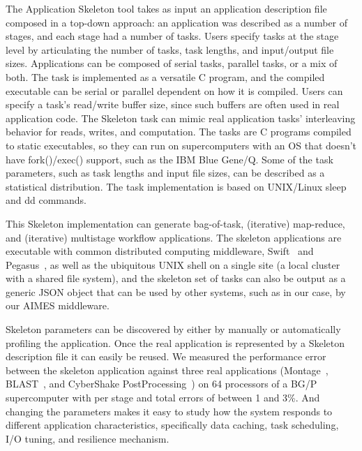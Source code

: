 \documentclass[preprint,12pt]{elsarticle}
\begin{document}
The Application Skeleton tool takes as input an application description file composed in a top-down approach: an application was described
as a number of stages, and each stage had a number of tasks. Users specify tasks at the stage level by articulating
the number of tasks, task lengths, and input/output file sizes. Applications can be composed of serial tasks, parallel tasks, or a mix of both. The task is implemented as a versatile C program, and the compiled executable can be serial or parallel dependent on how it is compiled. 
Users can specify a task's read/write buffer size, since such buffers are often used in real application code. 
The Skeleton task can mimic real application tasks' interleaving behavior for reads, writes, and computation. 
The tasks are C programs compiled to static executables, so they can run on supercomputers with an OS that doesn't have fork()/exec() support, such as the IBM Blue Gene/Q. 
Some of the task parameters, such as task lengths and input file sizes, can be
described as a statistical distribution.
The task implementation is based on UNIX/Linux sleep and dd commands. 

This Skeleton implementation can generate bag-of-task, (iterative) map-reduce, and (iterative) multistage workflow applications. 
The skeleton applications are executable with common
distributed computing middleware, Swift~\cite{SWIFT2007, swift-ieee09, Swift_2011} and Pegasus~\cite{pegasus, pegasus-04}, as well as the ubiquitous UNIX shell on a single 
site (a local cluster with a shared file system), and the skeleton set of tasks can also be output as a generic JSON object that can be used by other systems, such as in our case, by our AIMES middleware.

Skeleton parameters can be discovered by either by manually or automatically profiling the application.
Once the real application is represented by a Skeleton description file it can easily be reused.  
We measured the performance error between the skeleton application against three real applications (Montage~\cite{montage1,montage2}, BLAST~\cite{ParallelBlast}, and CyberShake PostProcessing~\cite{SCEC07}) on 64 processors of a BG/P supercomputer with per stage and total errors of between 1 and 3\%.
And changing the parameters makes it easy to study how the system responds to different application characteristics, specifically data caching, task scheduling, I/O tuning, and resilience mechanism.
\end{document}
